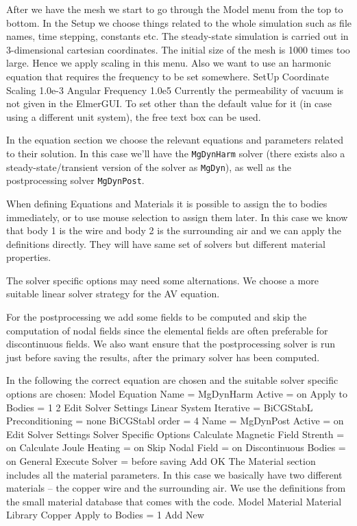 After we have the mesh we start to go through the Model menu from the top to bottom. 
In the Setup we choose things related to the whole simulation such as file names, 
time stepping, constants etc.
The steady-state simulation is carried out in 3-dimensional cartesian
coordinates. The initial size of the mesh is 1000 times too large. Hence we apply scaling in this menu.
Also we want to use an harmonic equation that requires the frequency to be set somewhere. 
\ttbegin
SetUp
  Coordinate Scaling 
    1.0e-3
  Angular Frequency
    1.0e5   
\ttend
Currently the permeability of vacuum is not given
in the ElmerGUI. To set other than the default value for it (in case using a different unit system),
the free text box can be used.

In the equation section we choose the relevant equations and parameters related to their solution. 
In this case we'll have the \texttt{MgDynHarm} solver (there exists also a steady-state/transient version of the solver
as \texttt{MgDyn}), as well as the postprocessing solver \texttt{MgDynPost}.

When defining Equations and Materials it is possible to assign the to bodies immediately, or to use mouse
selection to assign them later. In this case we know that body 1 is the wire and body 2 is the surrounding air and we
can apply the definitions directly.
They will have same set of solvers but different material properties. 

The solver specific options may need some alternations. We choose a more suitable
linear solver strategy for the AV equation. 

For the postprocessing we add some fields to be computed and skip the computation of nodal fields since the
elemental fields are often preferable for discontinuous fields. 
We also want ensure that the postprocessing solver is run just before saving the results, after the primary solver has been computed.

In the following the correct equation are chosen and the suitable solver specific options are chosen:
\ttbegin
Model
  Equation
    Name = MgDynHarm
      Active = on
      Apply to Bodies = 1 2  
      Edit Solver Settings
        Linear System
          Iterative = BiCGStabL
        Preconditioning = none
        BiCGStabl order = 4    
    Name = MgDynPost
      Active = on
      Edit Solver Settings
        Solver Specific Options
          Calculate Magnetic Field Strenth = on
          Calculate Joule Heating = on
          Skip Nodal Field = on
          Discontinuous Bodies = on
        General
          Execute Solver = before saving   
    Add 
    OK
\ttend        
The Material section includes all the material parameters. In this case we basically have two 
different materials -- the copper wire and the surrounding air.
We use the definitions from the small material database that comes with the code.
\ttbegin
Model
  Material
    Material Library
      Copper
    Apply to Bodies = 1
    Add
    New

